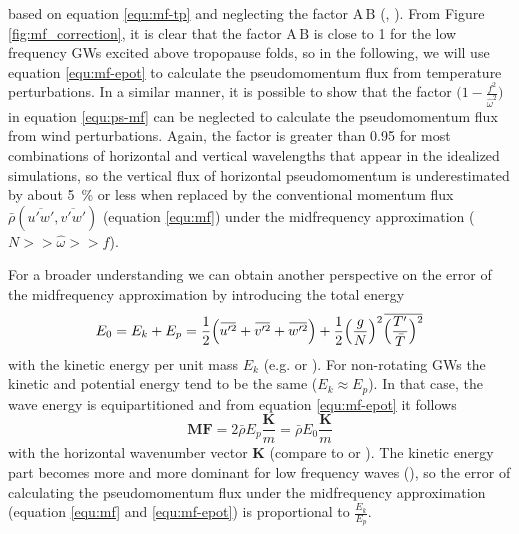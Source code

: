 based on equation \ref{equ:mf-tp} and neglecting the factor $\textrm{A} \, \textrm{B}$ (\cite[]{ern_gracile_2018}, \cite*[]{ern_intermittency_2022}). From Figure \ref{fig:mf_correction}, it is clear that the factor $\textrm{A} \, \textrm{B}$ is close to 1 for the low frequency GWs excited above tropopause folds, so in the following, we will use equation \ref{equ:mf-epot} to calculate the pseudomomentum flux from temperature perturbations. In a similar manner, it is possible to show that the factor $\bigl(1-\frac{f^2}{\hat{\omega}^2}\bigr)$ in equation \ref{equ:ps-mf} can be neglected to calculate the pseudomomentum flux from wind perturbations. Again, the factor is greater than 0.95 for most combinations of horizontal and vertical wavelengths that appear in the idealized simulations, so the vertical flux of horizontal pseudomomentum is underestimated by about \SI{5}{\percent} or less when replaced by the conventional momentum flux $\bar{\rho}(\overbar{u'w'},\overbar{v'w'})$ (equation \ref{equ:mf}) under the midfrequency approximation ($N >> \hat{\omega} >> f$).

For a broader understanding we can obtain another perspective on the error of the midfrequency approximation by introducing the total energy
\begin{equation}
    E_0 = E_k + E_p = \frac{1}{2} \Bigl(\overbar{u'^2} + \overbar{v'^2} + \overbar{w'^2}\Bigr) + \frac{1}{2} \Bigl(\frac{g}{N}\Bigr)^2 \overbar{\Bigl(\frac{T'}{\bar{T}}\Bigr)^2}
    \label{equ:etot}
\end{equation}
with the kinetic energy per unit mass $E_k$ (e.g. \cite[]{gill_atmosphere-ocean_1982} or \cite[]{tsuda_global_2000}). For non-rotating GWs the kinetic and potential energy tend to be the same ($ E_k \approx E_p$). In that case, the wave energy is equipartitioned and from equation \ref{equ:mf-epot} it follows
\begin{equation}
    \mathbf{MF} = 2 \bar{\rho} E_p \frac{\mathbf{K}}{m} = \bar{\rho} E_{0} \frac{\mathbf{K}}{m}
    \label{equ:mf-etot}
\end{equation}
with the horizontal wavenumber vector $\mathbf{K}$ (compare to \cite[]{andrews_wave-action_1978} or \cite[]{fritts_gravity_2003}). The kinetic energy part becomes more and more dominant for low frequency waves (\cite[]{gill_atmosphere-ocean_1982}), so the error of calculating the pseudomomentum flux under the midfrequency approximation (equation \ref{equ:mf} and \ref{equ:mf-epot}) is proportional to $\frac{E_k}{E_p}$.  


